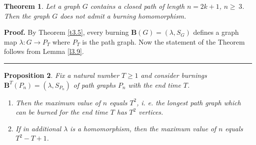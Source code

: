 \documentclass[a4paper, 11pt]{article}
\newtheorem{theorem}{Theorem}[section]
\newtheorem{proposition}[theorem]{Proposition}
\newenvironment{proof}[1][Proof]{\textbf{#1.} }{\ \rule{0.5em}{0.5em}}
\begin{document}
\begin{theorem}\label{t3.10} Let a graph $G$ contains a closed path  of length $n=2k+1$, $n\geq~3$. Then the graph $G$ does not admit a burning homomorphism.
\end{theorem} 
\begin{proof}  By Theorem \ref{t3.5}, every burning $\mathbf B(G)=(\lambda, S_G)$ defines a 
 graph map $\lambda\colon G\to P_T$ where $P_T$ is the path graph.  Now the statement of the Theorem follows from Lemma \ref{l3.9}. 
\end{proof}

\begin{proposition}\label{p3.11} Fix a natural number $T\ge 1$ and consider burnings 
$\mathbf B^T(P_n)=(\lambda, S_{P_n})$ of  path graphs $P_n$ with the end time $T$.
\begin{enumerate}[label=$(\roman*)$]

\item  Then the maximum value of $n$  equals  $T^2$, i. e.  the longest path graph which can be burned  for the end time $T$ has $T^2$ vertices.  
\item 
If in additional $\lambda$ is a homomorphism, then  the maximum value of $n$  equals  $T^2-T+1$.
\end{enumerate}
\end{proposition}
\end{document}
